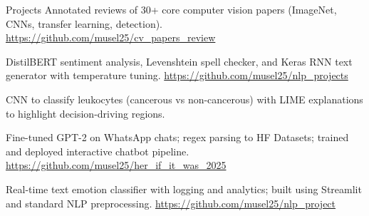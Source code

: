 \begin{rubric}{Projects}
Annotated reviews of 30+ core computer vision papers (ImageNet, CNNs, transfer learning, detection).\hfill {} \url{https://github.com/musel25/cv_papers_review}

DistilBERT sentiment analysis, Levenshtein spell checker, and Keras RNN text generator with temperature tuning.\hfill {} \url{https://github.com/musel25/nlp_projects}

CNN to classify leukocytes (cancerous vs non-cancerous) with LIME explanations to highlight decision-driving regions.

Fine-tuned GPT-2 on WhatsApp chats; regex parsing to HF Datasets; trained and deployed interactive chatbot pipeline.\hfill {} \url{https://github.com/musel25/her_if_it_was_2025}

Real-time text emotion classifier with logging and analytics; built using Streamlit and standard NLP preprocessing.\hfill {} \url{https://github.com/musel25/nlp_project}

\end{rubric}

